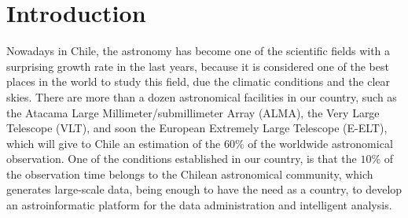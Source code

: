 %

\section{Introduction}

Nowadays in  Chile, the astronomy has become one of the scientific fields with a
surprising growth rate in the last years, because it is considered one of the best
places in the world to study this field, due the climatic conditions and
the clear skies.
There are more than a dozen astronomical facilities in our country, such as the
Atacama Large Millimeter/submillimeter Array (ALMA), the Very Large
Telescope (VLT), and soon the European Extremely Large Telescope (E-ELT),
which will give to Chile an estimation of the $60\%$  of the worldwide astronomical
observation.
One of the conditions established in our country, is
that the $10\%$ of the observation time belongs to the Chilean astronomical community,
which generates large-scale data, being enough to have the need as a country,
to develop an astroinformatic platform for the data administration and
intelligent analysis.
